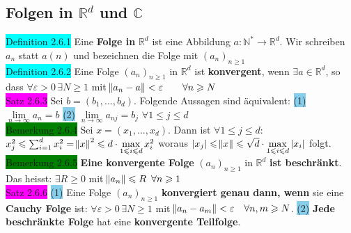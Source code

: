 \documentclass[landscape, 10pt]{article}
\newcommand{\R}{\mathbb{R}}
\newcommand{\N}{\mathbb{N}}
\newcommand{\C}{\mathbb{C}}
\begin{document}
\begin{multicols}{3}
       \subsection{Folgen in $\R^d$ und $\C$}
              \colorbox{cyan}{Definition 2.6.1} Eine \textbf{Folge in} 
                     \textcolor{NavyBlue}{$\R^d$} ist eine Abbildung 
                     \textcolor{NavyBlue}{$a:\N^*\longrightarrow\R^d$}. 
                     Wir schreiben $a_n$ statt $a(n)$ und bezeichnen 
                     die Folge mit \textcolor{NavyBlue}{$(a_n)_{n\geqslant1}$}\\
              \colorbox{cyan}{Definition 2.6.2} 
                     Eine Folge $(a_n)_{n\geqslant1}$ in $\R^d$ 
                     ist \textbf{konvergent}, wenn 
                     \textcolor{NavyBlue}{$\exists a\in\R^d$}, so dass
                     \textcolor{NavyBlue}{
                     $\forall\varepsilon >0\,\exists N\geqslant1$} mit 
                     \textcolor{NavyBlue}{
                     $\norm{a_n-a}<\varepsilon\qquad\forall n\geqslant N$}\\
              \colorbox{magenta}{Satz 2.6.3} 
                     Sei \textcolor{NavyBlue}{$b=(b_1,...,b_d)$}. 
                     Folgende Aussagen sind äquivalent:
                     \colorbox{SkyBlue}{(1)} 
                     \textcolor{NavyBlue}{$\lim\limits_{n\to\infty}a_n=b$}
                     \colorbox{SkyBlue}{(2)} 
                     \textcolor{NavyBlue}{
                     $\lim\limits_{n\to\infty}a_{nj}=b_j$\quad
                     $\forall 1\leqslant j\leqslant d$}\\
              \colorbox{green}{Bemerkung 2.6.4} Sei \textcolor{NavyBlue}{$x=(x_1,...,x_d)$}. Dann ist 
                     \textcolor{NavyBlue}{$\forall 1\leqslant j\leqslant d$:
                     $x^2_j\leqslant\sum_{i=1}^{d}x_i^2=\norm{x}^2\leqslant 
                     d\cdot \max\limits_{1\leqslant i\leqslant d}x_i^2$} woraus 
                     \textcolor{NavyBlue}{$|x_j|\leqslant \norm{x}\leqslant
                     \sqrt{d}\cdot\max\limits_{1\leqslant i\leqslant d}|x_i|$} folgt.\\
              \colorbox{green}{Bemerkung 2.6.5} \textbf{Eine konvergente Folge} $(a_n)_{n\geqslant1}$ in 
                     $\R^d$ \textbf{ist beschränkt}. Das heisst: 
                     \textcolor{NavyBlue}{$\exists R\geqslant0$} mit 
                     \textcolor{NavyBlue}{
                     $\norm{a_n}\leqslant R\enspace\forall n\geqslant1$}\\
              \colorbox{magenta}{Satz 2.6.6} \colorbox{SkyBlue}{(1)} Eine Folge $(a_n)_{n\geqslant1}$ 
                     \textbf{konvergiert genau dann, wenn} sie eine 
                     \textbf{Cauchy Folge} ist: 
                     \textcolor{NavyBlue}{$\forall\varepsilon >0\,\exists N\geqslant1$} mit 
                     \textcolor{NavyBlue}{$\norm{a_n-a_m}<\varepsilon\quad\forall n,m\geqslant N$}.
                     \colorbox{SkyBlue}{(2)} \textbf{Jede beschränkte Folge} hat eine 
                     \textbf{konvergente Teilfolge}.

\end{multicols}
\end{document}

